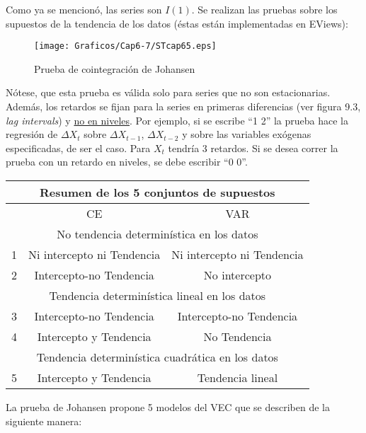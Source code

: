 Como ya se mencion\'{o}, las series son $I(1)$. Se realizan las pruebas sobre los supuestos de la tendencia de los datos (\'{e}stas est\'{a}n implementadas en EViews):

\begin{figure}[H]
\centering
\texttt{[image: Graficos/Cap6-7/STcap65.eps]}
\caption{Prueba de cointegraci\'{o}n de Johansen}
\label{fig5}
\end{figure}


N\'{o}tese, que esta prueba es v\'{a}lida solo para series que no son estacionarias. Adem\'{a}s, los retardos se fijan para la series en primeras diferencias (ver figura 9.3, \textit{lag intervals}) y \underline {no en niveles}. Por ejemplo, si se escribe ``1 2'' la prueba hace la regresi\'{o}n de $\Delta X_{t}$ sobre $\Delta X_{t-1}$, $\Delta X_{t-2}$ y sobre las variables ex\'{o}genas especificadas, de ser el caso. Para $X_{t}$ tendr\'{i}a 3 retardos. Si se desea correr la prueba con un retardo en niveles, se debe escribir ``0 0''. 

\begin{table}[H]
\centering
\begin{tabular}{|c|c|c|}\hline
\multicolumn{3}{|c|}{Resumen de los 5 conjuntos de supuestos} \\ \hline
 & CE & VAR \\ \hline
\multicolumn{3}{|c|}{No tendencia determin\'{i}stica en los datos} \\ \hline
1 & Ni intercepto ni Tendencia & Ni intercepto ni Tendencia \\ \hline
2 &  Intercepto-no Tendencia &  No intercepto \\ \hline
\multicolumn{3}{|c|}{Tendencia determin\'{i}stica lineal en los datos} \\ \hline
3 &  Intercepto-no Tendencia &  Intercepto-no Tendencia \\ \hline
4 &  Intercepto y Tendencia &  No Tendencia \\ \hline
\multicolumn{3}{|c|}{Tendencia determin\'{i}stica cuadr\'{a}tica en los datos} \\ \hline
5 &  Intercepto y Tendencia &  Tendencia lineal \\ \hline
\end{tabular}
\label{tab8}
\end{table}
 
La prueba de Johansen propone 5 modelos del VEC que se describen de la siguiente manera:


